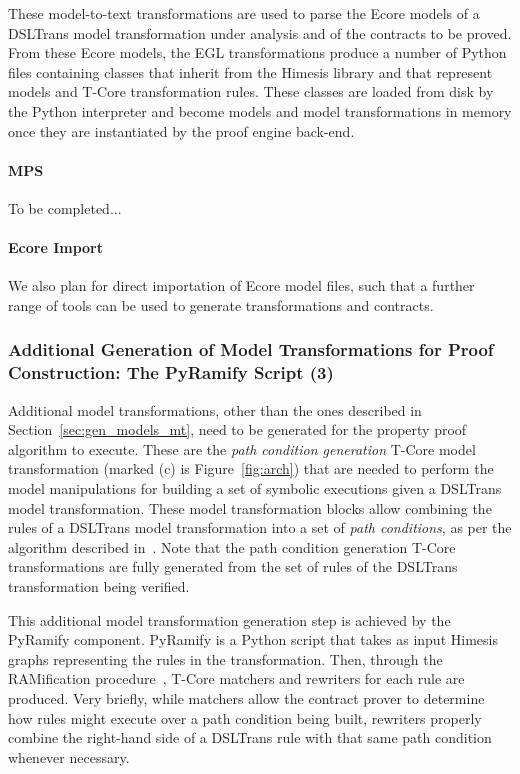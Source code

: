These model-to-text transformations are used to parse the Ecore models of a
DSLTrans model transformation under analysis and of the contracts to be proved.
From these Ecore models, the EGL transformations produce a number of Python
files containing classes that inherit from the Himesis library and that
represent models and T-Core transformation rules. These classes are loaded from
disk by the Python interpreter and become models and model transformations in
memory once they are instantiated by the proof engine back-end.


\paragraph{MPS}

To be completed...

\paragraph{Ecore Import}

We also plan for direct importation of Ecore model files, such that a further range of tools can be used to generate transformations and contracts.


\subsubsection{Additional Generation of Model Transformations for Proof
Construction: The PyRamify Script (3)}

Additional model transformations, other than the ones described in
Section~\ref{sec:gen_models_mt}, need to be generated for the property proof
algorithm to execute. These are the \emph{path condition generation} T-Core
model transformation (marked (c) is Figure~\ref{fig:arch}) that are
needed to perform the model manipulations for building a set of symbolic
executions given a DSLTrans model transformation. These model transformation
blocks allow combining the rules of a DSLTrans model
transformation into a set of \emph{path conditions}, as per the algorithm
described in~\cite{Lucio2014}. Note that the path condition generation T-Core
transformations are fully generated from the set of rules of the DSLTrans
transformation being verified.

This additional model transformation generation step is achieved by the PyRamify
component. PyRamify is a Python script that
takes as input Himesis graphs representing the rules in the transformation.
Then, through the RAMification procedure~\cite{KuhneMSVW09}, T-Core matchers and
rewriters for each rule are produced. Very briefly, while matchers allow the
contract prover to determine how rules might execute over a path condition being
built, rewriters properly combine the right-hand side of a DSLTrans rule with
that same path condition whenever necessary.

